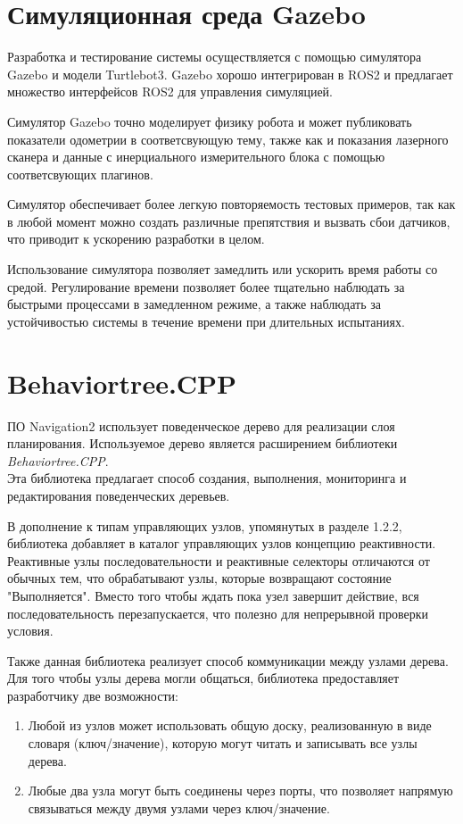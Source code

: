 \section{Симуляционная среда Gazebo}

Разработка и тестирование системы осуществляется с помощью симулятора Gazebo и модели Turtlebot3. Gazebo хорошо интегрирован в ROS2 и предлагает множество интерфейсов ROS2 для управления симуляцией. 

Симулятор Gazebo точно моделирует физику робота и может публиковать показатели одометрии в соответсвующую тему, также как и показания лазерного сканера и данные с инерциального измерительного блока с помощью соответсвующих плагинов. 

Симулятор обеспечивает более легкую повторяемость тестовых примеров, так как в любой момент можно создать различные препятствия и вызвать сбои датчиков, что приводит к ускорению разработки в целом.

Использование симулятора позволяет замедлить или ускорить время работы со средой. Регулирование времени позволяет более тщательно наблюдать за быстрыми процессами в замедленном режиме, а также наблюдать за устойчивостью системы в течение времени при длительных испытаниях.

\section{Behaviortree.CPP}
ПО Navigation2 использует поведенческое дерево для реализации слоя планирования. Используемое дерево является расширением библиотеки \textit{Behaviortree.CPP}. \\ 
Эта библиотека предлагает способ создания, выполнения, мониторинга и редактирования поведенческих деревьев.

В дополнение к типам управляющих узлов, упомянутых в разделе 1.2.2, библиотека добавляет в каталог управляющих узлов концепцию реактивности. Реактивные узлы последовательности и реактивные селекторы отличаются от обычных тем, что обрабатывают узлы, которые возвращают состояние "Выполняется". Вместо того чтобы ждать пока узел завершит действие, вся последовательность перезапускается, что полезно для непрерывной проверки условия.

Также данная библиотека реализует способ коммуникации между узлами дерева. Для того чтобы узлы дерева могли общаться, библиотека предоставляет разработчику две возможности:
\begin{enumerate}
    \item Любой из узлов может использовать общую доску, реализованную в виде словаря (ключ/значение), которую могут читать и записывать все узлы дерева.
    \item Любые два узла могут быть соединены через порты, что позволяет напрямую связываться между двумя узлами через ключ/значение.
\end{enumerate}


